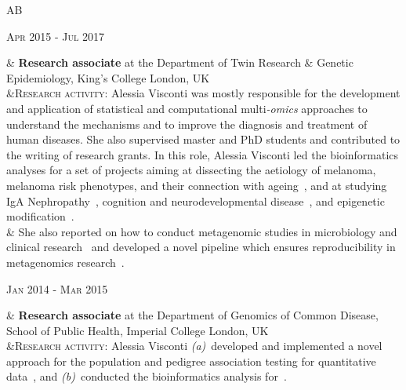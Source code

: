 \documentclass[a4paper,10pt]{article}
\newenvironment{doubletablelist}
{
	\vspace{-0.2cm}
	\begin{longtable}[!h]{AB}}{\end{longtable}
}
\newcommand{\dtlist}[2]{
\hspace{-3cm}
\noindent
	\begin{minipage}{0.22\textwidth}
	\begin{flushright}
	\textsc{#1}
	\end{flushright}
	\end{minipage}
	& #2\\[0.2cm]
}
\begin{document}
\begin{doubletablelist}
	
	\dtlist{Apr 2015 - Jul 2017}{\textbf{Research associate} at the Department of Twin Research \& Genetic Epidemiology, King's College London, UK \\ 
	&\textsc{Research activity}: Alessia Visconti was mostly responsible for the development and application of statistical and computational multi\emph{-omics} approaches to understand the mechanisms and to improve the diagnosis and treatment of human diseases. She also supervised master and PhD students and contributed to the writing of research grants.
	In this role, Alessia Visconti led the bioinformatics analyses for a set of projects aiming at dissecting the aetiology of melanoma, melanoma risk phenotypes, and their connection with ageing~\cite{Rib16,Hys18,Vis18a,Duf17}, and at studying IgA Nephropathy~\cite{Lom16}, cognition and neurodevelopmental disease~\cite{Cul18}, and epigenetic modification~\cite{Zag18}. \\
	 &  She also reported on how to conduct metagenomic studies in microbiology and clinical research~\cite{Vis18c} and developed a novel pipeline which ensures reproducibility in metagenomics research~\cite{Vis18b}.%
	}
	
    \dtlist{Jan 2014 - Mar 2015}{\textbf{Research associate} at the Department of Genomics of Common Disease, School of Public Health, Imperial College London, UK  \\
	 &\textsc{Research activity}: Alessia Visconti \emph{(a)}~developed and implemented a novel approach for the population and pedigree association testing for quantitative data~\cite{Vis16}, and \emph{(b)}~conducted the bioinformatics analysis for~\cite{Joh15,AlM15,Gia16,Pui16}.%
	}
	

\end{doubletablelist}
\end{document}
